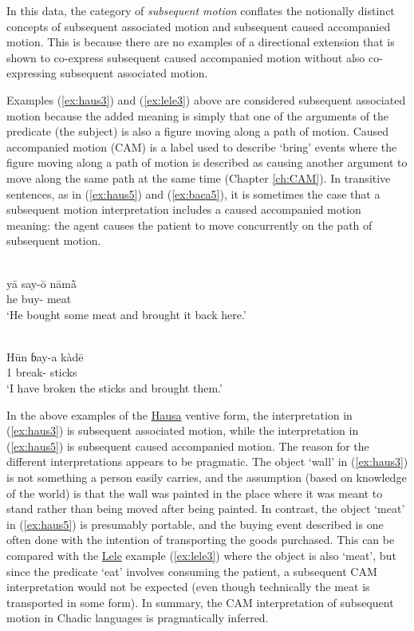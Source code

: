 In this data, the category of \textit{subsequent motion} conflates the notionally distinct concepts of subsequent associated motion and subsequent caused accompanied motion. This is because there are no examples of a directional extension that is shown to co-express subsequent caused accompanied motion without also co-expressing subsequent associated motion. 

Examples (\ref{ex:haus3}) and (\ref{ex:lele3}) above are considered subsequent associated motion because the added meaning is simply that one of the arguments of the predicate (the subject) is also a figure moving along a path of motion. Caused accompanied motion (CAM) is a label used to describe `bring' events where the figure moving along a path of motion is described as causing another argument to move along the same path at the same time (Chapter \ref{ch:CAM}). In transitive sentences, as in (\ref{ex:haus5}) and (\ref{ex:baca5}), it is sometimes the case that a subsequent motion interpretation includes a caused accompanied motion meaning: the agent causes the patient to move concurrently on the path of subsequent motion. 

\ea\label{ex:haus5}
 \\
\gll yā	say-ō	nāmā̀ \\
he	buy-	meat \\
\glt `He bought some meat and brought it back here.'

\ex\label{ex:baca5}
 \\
\gll Hūn ɓay-a kàdē	\\
1 break- sticks		\\
\glt `I have broken the sticks and brought them.'
\z 

In the above examples of the \hyperref[haus]{Hausa} ventive form, the interpretation in (\ref{ex:haus3}) is subsequent associated motion, while the interpretation in (\ref{ex:haus5}) is subsequent caused accompanied motion. The reason for the different interpretations appears to be pragmatic. The object `wall' in (\ref{ex:haus3}) is not something a person easily carries, and the assumption (based on knowledge of the world) is that the wall was painted in the place where it was meant to stand rather than being moved after being painted. In contrast, the object `meat' in (\ref{ex:haus5}) is presumably portable, and the buying event described is one often done with the intention of transporting the goods purchased. This can be compared with the \hyperref[lele]{Lele} example (\ref{ex:lele3}) where the object is also `meat', but since the predicate `eat' involves consuming the patient, a subsequent CAM interpretation would not be expected (even though technically the meat is transported in some form). In summary, the CAM interpretation of subsequent motion in Chadic languages is pragmatically inferred. 


